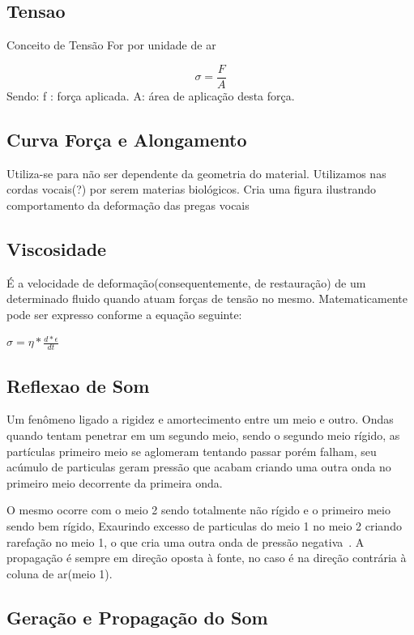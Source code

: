 		\subsection{Tensao}
		Conceito de Tensão For por unidade de ar
		
		\[
		\sigma = \frac{F}{A}
		\]
		Sendo:
		f : força aplicada. \linebreak
		A: área de aplicação desta força.
		
		\subsection{Curva Força e Alongamento}
		Utiliza-se para não ser dependente da geometria do material. Utilizamos nas cordas vocais(?) por serem materias biológicos. Cria uma figura ilustrando comportamento da deformação das pregas vocais
		
		
		\subsection{Viscosidade}
		É a velocidade de deformação(consequentemente, de restauração) de
		um determinado fluido quando atuam forças de tensão no mesmo. Matematicamente
		pode ser expresso conforme a equação seguinte: 
		
		$
		\sigma = \eta * \frac{d*\epsilon}{dt}
		$
		
		\subsection{Reflexao de Som}
		
		Um fenômeno ligado a rigidez e amortecimento entre um meio e outro.\cite{MTAGENTE}
		Ondas quando tentam penetrar em um segundo meio, sendo o segundo meio rígido, as partículas primeiro meio se aglomeram tentando passar porém
		falham, seu acúmulo de particulas geram pressão que acabam criando uma outra onda no primeiro meio decorrente da primeira onda.\cite{HenryGray}
		
		O mesmo ocorre com o meio 2 sendo totalmente não rígido e o primeiro meio sendo bem rígido, Exaurindo excesso de particulas  do meio 1 no meio 2 criando rarefação no meio 1, o que cria uma outra onda de pressão negativa~\cite{FlanaganLandgraf}. A propagação é sempre em direção oposta à fonte, no caso é na direção contrária à coluna de ar(meio 1). 
		
		
		\subsection{Geração e Propagação do Som}
		

